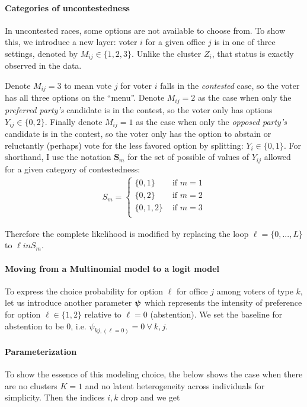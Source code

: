 \documentclass[11pt]{article}
\begin{document}
\paragraph{Categories of uncontestedness} In uncontested races, some options are not available to choose from. To show this, we introduce a new layer: voter \(i\) for a given office \(j\) is in one of three settings, denoted by \(M_{ij} \in \{1, 2, 3\}\). Unlike the cluster \(Z_i\), that status is exactly observed in the data. 

Denote \(M_{ij} = 3\) to mean vote \(j\) for voter \(i\) falls in the \emph{contested} case, so the voter has all three options on the ``menu''. Denote \(M_{ij} = 2\) as the case when only the \emph{preferred party's} candidate is in the contest, so the voter only has options \(Y_{ij} \in \{0, 2\}\). Finally denote \(M_{ij} = 1\) as the case when only the \emph{opposed party's} candidate is in the contest, so the voter only has the option to abstain or reluctantly (perhaps) vote for the less favored option by splitting: \(Y_{i} \in \{0, 1\}\). For shorthand, I use the notation \(\bm{S}_{m}\) for the set of possible of values of \(Y_{ij}\) allowed for a given category of contestedness:
\begin{align*}
S_{m} = \begin{cases}
\{0, 1\} & \text{~if~} m = 1\\
\{0, 2\}  & \text{~if~} m = 2\\
\{0, 1, 2\} & \text{~if~} m = 3\\
\end{cases}
\end{align*}

Therefore the complete likelihood is modified by replacing the loop \(\ell = \{0, ..., L\}\) to \(\ell in S_m\).


\paragraph{Moving from a Multinomial model to a logit model} To express the choice probability for option \(\ell\) for office \(j\) among voters of type \(k\), let us introduce another parameter \(\bm{\psi}\) which represents the intensity of preference for option \(\ell \in \{1, 2\}\) relative to \(\ell = 0\) (abstention). We set the baseline for abstention to be 0, i.e. \(\psi_{kj,(\ell=0)} = 0 ~\forall~ k, j\).  


\paragraph{Parameterization} To show the essence of this modeling choice, the below shows the case when there are no clusters \(K = 1\) and no latent heterogeneity across individuals for simplicity. Then the indices \(i, k\) drop and we get
\end{document}
